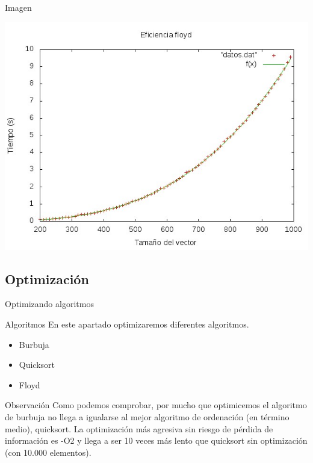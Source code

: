 \documentclass[compress]{beamer}
\begin{document}
\begin{frame}
	\begin{alertblock}{Imagen}
	\begin{center}
	\includegraphics[scale=0.50]{../Graficas/Floyd/floydO0_ruben.jpeg}	
	\end{center}
	\end{alertblock}
\end{frame}



\subsection{Optimización}
\begin{frame}{Optimizando algoritmos}
	\begin{block}{Algoritmos}
	En este apartado optimizaremos diferentes algoritmos.
	\begin{itemize}
	\item Burbuja
	\item Quicksort
	\item Floyd
	\end{itemize}
	\end{block}
	
	\pause
	\begin{block}{Observación}
	Como podemos comprobar, por mucho que optimicemos el algoritmo de burbuja no llega a igualarse al mejor algoritmo de ordenación (en término medio), quicksort. La optimización más agresiva sin riesgo de pérdida de información es -O2 y llega a ser 10 veces más lento que quicksort sin optimización (con 10.000 elementos).
	\end{block}
\end{frame}
\end{document}
